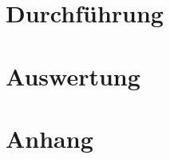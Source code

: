 \documentclass[10pt,a4paper]{scrartcl}
\begin{document}
\section {Durchführung}

\section {Auswertung}



\pagebreak

\section {Anhang}
\end{document}
